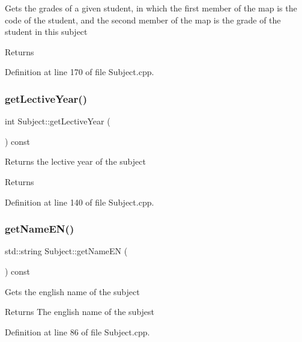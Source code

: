 Gets the grades of a given student, in which the first member of the map is the code of the student, and the second member of the map is the grade of the student in this subject \begin{DoxyReturn}{Returns}

\end{DoxyReturn}


Definition at line 170 of file Subject.\+cpp.

\mbox{\label{classSubject_ad03c422fb716222b2c49c41b7506827a}} 
\subsubsection{\texorpdfstring{get\+Lective\+Year()}{getLectiveYear()}}
{\footnotesize\ttfamily int Subject\+::get\+Lective\+Year (\begin{DoxyParamCaption}{ }\end{DoxyParamCaption}) const}

Returns the lective year of the subject \begin{DoxyReturn}{Returns}

\end{DoxyReturn}


Definition at line 140 of file Subject.\+cpp.

\mbox{\label{classSubject_a9419a1c4e2248fee00baf3885655ba49}} 
\subsubsection{\texorpdfstring{get\+Name\+E\+N()}{getNameEN()}}
{\footnotesize\ttfamily std\+::string Subject\+::get\+Name\+EN (\begin{DoxyParamCaption}{ }\end{DoxyParamCaption}) const}

Gets the english name of the subject \begin{DoxyReturn}{Returns}
The english name of the subjest 
\end{DoxyReturn}


Definition at line 86 of file Subject.\+cpp.

\mbox{\label{classSubject_a4fb200b5b33dab2166a9a1ee6dbe7443}} 
